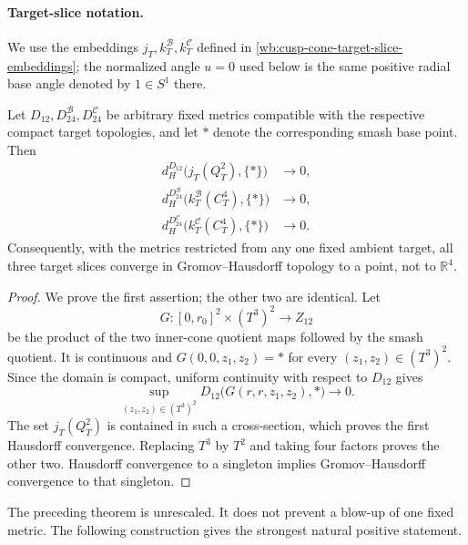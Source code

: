\paragraph{Target-slice notation.}
We use the embeddings
\(j_T,k_T^{\mathcal B},k_T^{\mathcal C}\) defined in
\cref{wb:cusp-cone-target-slice-embeddings}; the normalized angle \(u=0\) used
below is the same positive radial base angle denoted by \(1\in S^1\) there.

\begin{theorem}
\label{wb:sphere-metric-uniform-collapse}
Let \(D_{12},D_{24}^{\mathcal B},D_{24}^{\mathcal C}\) be arbitrary fixed
metrics compatible with the respective compact target topologies, and let
\(*\) denote the corresponding smash base point.  Then
\begin{align}
 d_H^{D_{12}}\bigl(j_T(Q_T^2),\{*\}\bigr)&\longrightarrow0,\\
 d_H^{D_{24}^{\mathcal B}}
  \bigl(k_T^{\mathcal B}(C_T^4),\{*\}\bigr)&\longrightarrow0,\\
 d_H^{D_{24}^{\mathcal C}}
  \bigl(k_T^{\mathcal C}(C_T^4),\{*\}\bigr)&\longrightarrow0.
 \label{wb:sphere-metric-Hausdorff-collapse}
\end{align}
Consequently, with the metrics restricted from any one fixed ambient
target, all three target slices converge in Gromov--Hausdorff topology to
a point, not to \(\mathbb R^4\).
\end{theorem}

\begin{proof}
We prove the first assertion; the other two are identical.  Let
\[
 G:[0,r_0]^2\times(T^3)^2\longrightarrow Z_{12}
\]
be the product of the two inner-cone quotient maps followed by the smash
quotient.  It is continuous and
\(G(0,0,z_1,z_2)=*\) for every \((z_1,z_2)\in(T^3)^2\).  Since the domain
is compact, uniform continuity with respect to \(D_{12}\) gives
\[
 \sup_{(z_1,z_2)\in(T^3)^2}
 D_{12}\bigl(G(r,r,z_1,z_2),*\bigr)\longrightarrow0.
\]
The set \(j_T(Q_T^2)\) is contained in such a cross-section, which proves
the first Hausdorff convergence.  Replacing \(T^3\) by \(T^2\) and taking
four factors proves the other two.  Hausdorff convergence to a singleton
implies Gromov--Hausdorff convergence to that singleton.
\end{proof}

The preceding theorem is unrescaled.  It does not prevent a blow-up of one
fixed metric.  The following construction gives the strongest natural
positive statement.

